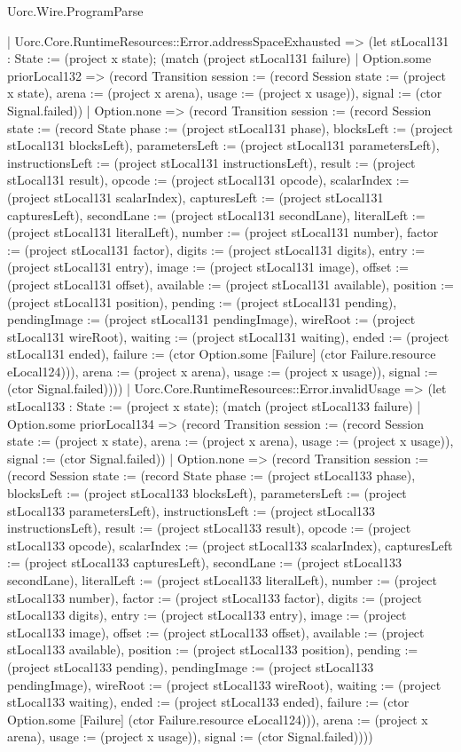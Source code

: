 \begin{lexlean}{Uorc.Wire.ProgramParse}
\begin{semanticmodule}
{      | Uorc.Core.RuntimeResources::Error.addressSpaceExhausted => (let stLocal131 : State := (project x state); (match (project stLocal131 failure)
        | Option.some priorLocal132 => (record Transition {session := (record Session {state := (project x state), arena := (project x arena), usage := (project x usage)}), signal := (ctor Signal.failed)})
        | Option.none => (record Transition {session := (record Session {state := (record State {phase := (project stLocal131 phase), blocksLeft := (project stLocal131 blocksLeft), parametersLeft := (project stLocal131 parametersLeft), instructionsLeft := (project stLocal131 instructionsLeft), result := (project stLocal131 result), opcode := (project stLocal131 opcode), scalarIndex := (project stLocal131 scalarIndex), capturesLeft := (project stLocal131 capturesLeft), secondLane := (project stLocal131 secondLane), literalLeft := (project stLocal131 literalLeft), number := (project stLocal131 number), factor := (project stLocal131 factor), digits := (project stLocal131 digits), entry := (project stLocal131 entry), image := (project stLocal131 image), offset := (project stLocal131 offset), available := (project stLocal131 available), position := (project stLocal131 position), pending := (project stLocal131 pending), pendingImage := (project stLocal131 pendingImage), wireRoot := (project stLocal131 wireRoot), waiting := (project stLocal131 waiting), ended := (project stLocal131 ended), failure := (ctor Option.some [Failure] (ctor Failure.resource eLocal124))}), arena := (project x arena), usage := (project x usage)}), signal := (ctor Signal.failed)})))
      | Uorc.Core.RuntimeResources::Error.invalidUsage => (let stLocal133 : State := (project x state); (match (project stLocal133 failure)
        | Option.some priorLocal134 => (record Transition {session := (record Session {state := (project x state), arena := (project x arena), usage := (project x usage)}), signal := (ctor Signal.failed)})
        | Option.none => (record Transition {session := (record Session {state := (record State {phase := (project stLocal133 phase), blocksLeft := (project stLocal133 blocksLeft), parametersLeft := (project stLocal133 parametersLeft), instructionsLeft := (project stLocal133 instructionsLeft), result := (project stLocal133 result), opcode := (project stLocal133 opcode), scalarIndex := (project stLocal133 scalarIndex), capturesLeft := (project stLocal133 capturesLeft), secondLane := (project stLocal133 secondLane), literalLeft := (project stLocal133 literalLeft), number := (project stLocal133 number), factor := (project stLocal133 factor), digits := (project stLocal133 digits), entry := (project stLocal133 entry), image := (project stLocal133 image), offset := (project stLocal133 offset), available := (project stLocal133 available), position := (project stLocal133 position), pending := (project stLocal133 pending), pendingImage := (project stLocal133 pendingImage), wireRoot := (project stLocal133 wireRoot), waiting := (project stLocal133 waiting), ended := (project stLocal133 ended), failure := (ctor Option.some [Failure] (ctor Failure.resource eLocal124))}), arena := (project x arena), usage := (project x usage)}), signal := (ctor Signal.failed)})))
}
\end{semanticmodule}
\end{lexlean}
